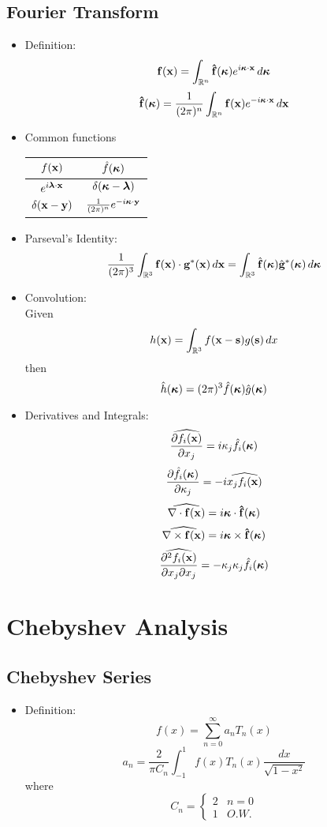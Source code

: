 \documentclass[oneside,a4paper,11pt]{article}
\newcommand{\fhvec}{\mathbf{\hat{f}}}
\begin{document}
\subsection{Fourier Transform}
\begin{itemize}
\item Definition:
\[\fvec(\xvec) = \int_{\Rn} \fhvec(\kvec)e^{i\kvec \cdot \xvec} \,d\kvec \]
\[\fhvec(\kvec) = \frac{1}{(2\pi)^n}\int_{\Rn} \fvec(\xvec)e^{-i\kvec \cdot \xvec} \,d\xvec\]

\item Common functions
\begin{center}
\begin{tabular}{|c|c|}
\hline
$f(\mathbf{x})$ & $\hat{f}(\boldsymbol\kappa)$ \\
\hline
$e^ {i \boldsymbol{\lambda} \cdot \mathbf{x}}$ & $\delta(\boldsymbol\kappa - \boldsymbol{\lambda})$ \\
\hline
$\delta(\mathbf{x} - \bold{y})$ & $\frac{1}{(2\pi)^n}e^{- i \boldsymbol\kappa \cdot \bold{y}} $ \\
\hline
\end{tabular}	
\end{center}

\item Parseval's Identity:
\[ \frac{1}{ ( 2 \pi )^3 } \int_{\mathbb{R}^3} \mathbf{f}(\mathbf{x}) \cdot \mathbf{g}^*(\mathbf{x}) \,d\mathbf{x} =  \int_{\mathbb{R}^3} \hat {\mathbf{f}}(\boldsymbol\kappa) \hat {\mathbf{g}}^*(\boldsymbol\kappa) \,d\boldsymbol\kappa \]

\item Convolution: \\
Given
\[ h( \mathbf{x} ) = \int_{{\mathbb{R}^3}} f( \mathbf{x} - \mathbf{s} )g( \mathbf{s} ) \, dx \]
then
\[\hat{h}(\boldsymbol\kappa) = (2\pi)^3 \hat{f}(\boldsymbol\kappa) \hat{g}(\boldsymbol\kappa) \]

\item Derivatives and Integrals:
\[ \widehat{\frac{\partial f_i(\mathbf{x})}{\partial x_j}} = i \kappa_j \hat f_i(\boldsymbol\kappa) \]
\[ \frac{\partial \hat{f}_i(\boldsymbol\kappa)}{\partial \kappa_j} = -i \widehat{x_jf_i(\mathbf{x})}\]
\[ \widehat{\nabla \cdot \bold{f}(\xvec)} = i \kvec \cdot \fhvec(\kvec) \]
\[ \widehat{\nabla \times \bold{f}(\xvec)} = i \kvec \times \fhvec(\kvec) \]
\[ \widehat{\frac{\partial^2 f_i(\mathbf{x})}{\partial x_j \partial x_j}} = - \kappa_j\kappa_j \hat{f}_i(\boldsymbol\kappa) \]
\end{itemize}

\section{Chebyshev Analysis}
\subsection{Chebyshev Series}
\begin{itemize}
\item Definition:
\[f(x)=\sum_{n=0}^{\infty}a_nT_n(x)\]
\[a_n=\frac{2}{\pi C_n}\int_{-1}^{1}f(x)T_n(x)\frac{dx}{\sqrt{1-x^2}}\]
where
\[ C_n = \left\{ \begin{array}{cc}  2 & n=0\\ 1 & O.W. \end{array}\right. \]
\end{itemize}
\end{document}
